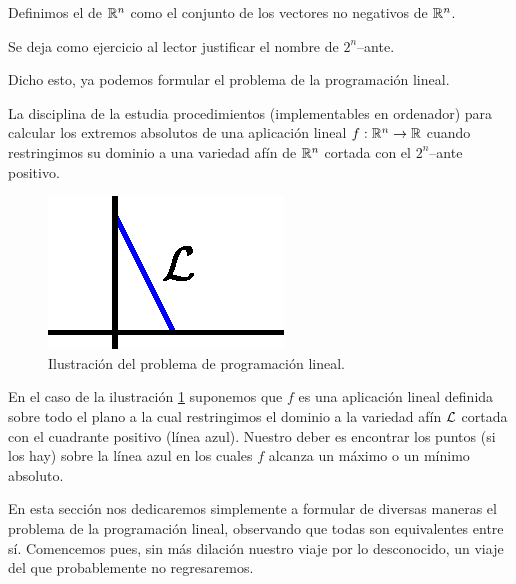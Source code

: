 \begin{defi}
	Definimos el  de $\mathbb{R}^n$ como el conjunto de los vectores no negativos de $\mathbb{R}^n$.
	
	Se deja como ejercicio al lector justificar el nombre de $2^n$--ante.
\end{defi}
Dicho esto, ya podemos formular el problema de la programación lineal.
\begin{prob}
	\label{fund_prob_formulacionGeneral}
	La disciplina de la  estudia procedimientos (implementables en ordenador) para calcular los extremos absolutos de una aplicación lineal $f:\mathbb{R}^n\to\mathbb{R}$ cuando restringimos su dominio a una variedad afín de $\mathbb{R}^n$ cortada con el $2^n$--ante positivo.
	
	\begin{figure}[h!]
		\centering
		\includegraphics[scale = 0.75]{img/problemaGeneral}
		\caption{Ilustración del problema de programación lineal.}
		\label{fund_img_problemaGeneral}
	\end{figure}
	En el caso de la ilustración \ref{fund_img_problemaGeneral} suponemos que $f$ es una aplicación lineal definida sobre todo el plano a la cual restringimos el dominio a la variedad afín $\mathcal{L}$ cortada con el cuadrante positivo (línea azul). Nuestro deber es encontrar los puntos (si los hay) sobre la línea azul en los cuales $f$ alcanza un máximo o un mínimo absoluto.
\end{prob} 
En esta sección nos dedicaremos simplemente a formular de diversas maneras el problema de la programación lineal, observando que todas son equivalentes entre sí. Comencemos pues, sin más dilación nuestro viaje por lo desconocido, un viaje del que probablemente no regresaremos.

